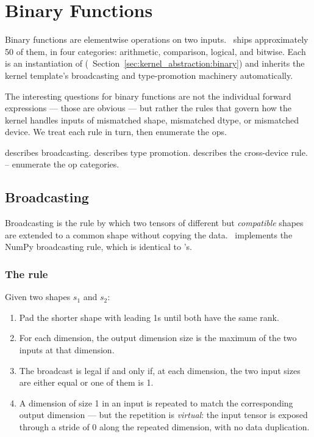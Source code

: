\chapter{Binary Functions}
\label{ch:binary_functions}

Binary functions are elementwise operations on two inputs.
\Lucid\ ships approximately 50 of them, in four categories:
arithmetic, comparison, logical, and bitwise. Each is an
instantiation of 
(~Section~\ref{sec:kernel_abstraction:binary})
and inherits the kernel template's broadcasting and type-promotion
machinery automatically.

The interesting questions for binary functions are not the
individual forward expressions --- those are obvious --- but rather
the rules that govern how the kernel handles inputs of mismatched
shape, mismatched dtype, or mismatched device. We treat each rule
in turn, then enumerate the ops.

 describes broadcasting.
 describes type promotion.
 describes the
cross-device rule.
--
enumerate the op categories.

\section{Broadcasting}
\label{sec:binary_functions:broadcast}

Broadcasting is the rule by which two tensors of different but
\emph{compatible} shapes are extended to a common shape without
copying the data. \Lucid\ implements the NumPy broadcasting rule,
which is identical to 's.

\subsection{The rule}
\label{ssec:binary_functions:broadcast_rule}

Given two shapes \(s_1\) and \(s_2\):

\begin{enumerate}
  \item Pad the shorter shape with leading 1s until both have the
    same rank.
  \item For each dimension, the output dimension size is the
    maximum of the two inputs at that dimension.
  \item The broadcast is legal if and only if, at each dimension,
    the two input sizes are either equal or one of them is 1.
  \item A dimension of size 1 in an input is repeated to match
    the corresponding output dimension --- but the repetition is
    \emph{virtual}: the input tensor is exposed through a stride of
    0 along the repeated dimension, with no data duplication.
\end{enumerate}

